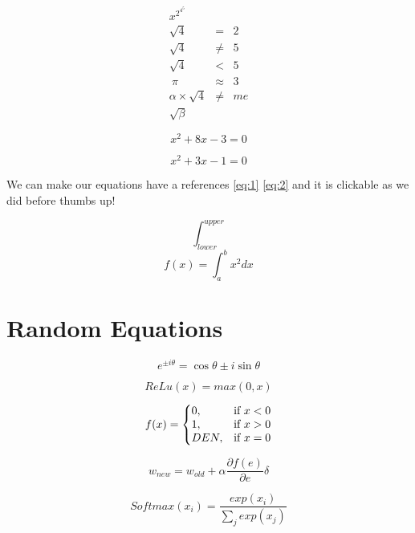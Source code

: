 \documentclass{article}
\begin{document}
\begin{eqnarray*}
    x^{2^{4^5}} \\
    \sqrt{4} &=& 2 \\ 
    \sqrt{4} &\neq& 5 \\ 
    \sqrt{4} &<&5 \\\
    \pi &\approx& 3 \\
    \alpha \times \sqrt{4} &\neq& me \\
    \sqrt{\beta} 
\end{eqnarray*}

\begin{equation}\label{eq:1}
x^2+8x-3=0
\end{equation}

\begin{equation}\label{eq:2}
x^2+3x-1=0
\end{equation}

We can make our equations have a references \ref{eq:1} \ref{eq:2} and it is clickable as we did before thumbs up!

$$\int_{lower}^{upper} $$
$$f(x) = \int_{a}^{b} x^2 dx$$

\newpage
\section{Random Equations}

\begin{equation}\label{eq:euler}
    e^{ \pm i\theta } = \cos \theta \pm i\sin \theta
\end{equation}


\begin{equation}\label{eq:relu}
ReLu(x)= max(0,x)
\end{equation}


    \begin{equation}\label{eq:derelu}
    f(x)=\left\{
    \begin{array}{@{}ll@{}}
    0, & \text{if}\ x < 0 \\
    1, & \text{if}\ x > 0 \\
    DEN, & \text{if}\ x = 0
    \end{array}\right.
    \end{equation} 
    
    \begin{equation}\label{eq:backprop}
        w_{new} = w_{old} + \alpha \frac{\partial f(e)}{\partial e} \delta
    \end{equation}


\begin{equation}\label{eq:softmax}
Softmax(x_i) = \frac{exp(x_i)}{\sum_{j}^{ }exp(x_j)}
\end{equation}
\end{document}
